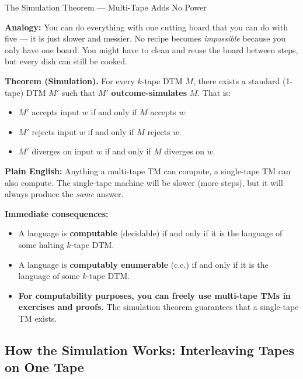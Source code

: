 \begin{conceptbox}{The Simulation Theorem --- Multi-Tape Adds No Power}

\textbf{Analogy:} You can do everything with one cutting board that you can do with five --- it is just slower and messier. No recipe becomes \textit{impossible} because you only have one board. You might have to clean and reuse the board between steps, but every dish can still be cooked.

\textbf{Theorem (Simulation).} For every $k$-tape DTM $M$, there exists a standard (1-tape) DTM $M'$ such that $M'$ \textbf{outcome-simulates} $M$. That is:
\begin{itemize}[nosep]
\item $M'$ accepts input $w$ if and only if $M$ accepts $w$.
\item $M'$ rejects input $w$ if and only if $M$ rejects $w$.
\item $M'$ diverges on input $w$ if and only if $M$ diverges on $w$.
\end{itemize}

\textbf{Plain English:} Anything a multi-tape TM can compute, a single-tape TM can also compute. The single-tape machine will be slower (more steps), but it will always produce the \textit{same} answer.

\textbf{Immediate consequences:}

\begin{itemize}[nosep]
\item A language is \textbf{computable} (decidable) if and only if it is the language of some halting $k$-tape DTM.
\item A language is \textbf{computably enumerable} (c.e.) if and only if it is the language of some $k$-tape DTM.
\item \textbf{For computability purposes, you can freely use multi-tape TMs in exercises and proofs.} The simulation theorem guarantees that a single-tape TM exists.
\end{itemize}

\end{conceptbox}


\subsection{How the Simulation Works: Interleaving Tapes on One Tape}

